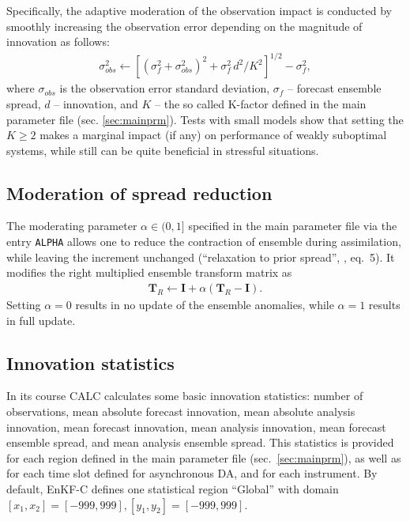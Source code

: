 \documentclass[11pt]{report}
\newcommand{\mb} {\mathbf}
\begin{document}
Specifically, the adaptive moderation of the observation impact is conducted by smoothly increasing the observation error depending on the magnitude of innovation as follows:
\begin{align*}
  \sigma^2_{obs} \leftarrow \left[(\sigma_{f}^2 + \sigma_{obs}^2)^2 + \sigma_f^2 \, d^2 / K^2\right]^{1/2} - \sigma_f^2,
\end{align*}
where $\sigma_{obs}$ is the observation error standard deviation, $\sigma_f$ -- forecast ensemble spread, $d$ -- innovation, and $K$ -- the so called K-factor defined in the main parameter file (sec. \ref{sec:mainprm}).
Tests with small models show that setting the $K \ge 2$ makes a marginal impact (if any) on performance of weakly suboptimal systems, while still can be quite beneficial in stressful situations.

\subsection{Moderation of spread reduction}

The moderating parameter $\alpha \in (0, 1]$ specified in the main parameter file via the entry \verb|ALPHA| allows one to reduce the contraction of ensemble during assimilation, while leaving the increment unchanged (``relaxation to prior spread'', \citealt{zha04a}, eq.~5).
It modifies the right multiplied ensemble transform matrix as
\begin{align*}
  \mb T_R \leftarrow \mb I + \alpha (\mb T_R - \mb I).
\end{align*}
Setting $\alpha = 0$ results in no update of the ensemble anomalies, while $\alpha = 1$ results in full update.

\subsection{Innovation statistics}

In its course CALC calculates some basic innovation statistics: number of observations, mean absolute forecast innovation, mean absolute analysis innovation, mean forecast innovation, mean analysis innovation, mean forecast ensemble spread, and mean analysis ensemble spread.
This statistics is provided for each region defined in the main parameter file (sec.~\ref{sec:mainprm}), as well as for each time slot defined for asynchronous DA, and for each instrument.
By default, EnKF-C defines one statistical region ``Global'' with domain $[x_1,x_2] = [-999,999], [y_1,y_2] = [-999,999]$.
\end{document}
